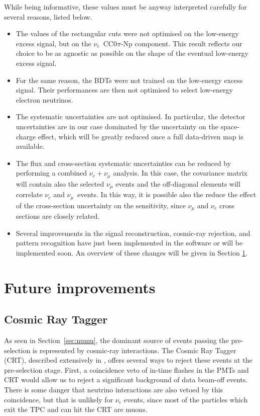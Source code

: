 While being informative, these values must be anyway interpreted carefully for several reasons, listed below.
\begin{itemize}
    \item The values of the rectangular cuts were not optimised on the low-energy excess signal, but on the $\nu_e$~CC0$\pi$-Np component. This result reflects our choice to be as agnostic as possible on the shape of the eventual low-energy excess signal.
    \item For the same reason, the BDTs were not trained on the low-energy excess signal. Their performances are then not optimised to select low-energy electron neutrinos.
    \item The systematic uncertainties are not optimised. In particular, the detector uncertainties are in our case dominated by the uncertainty on the space-charge effect, which will be greatly reduced once a full data-driven map is available.
    \item The flux and cross-section systematic uncertainties can be reduced by performing a combined $\nu_e+\nu_{\mu}$ analysis. In this case, the covariance matrix will contain also the selected $\nu_{\mu}$ events and the off-diagonal elements will correlate $\nu_e$ and $\nu_{\mu}$~events. In this way, it is possible also the reduce the effect of the cross-section uncertainty on the sensitivity, since $\nu_{\mu}$ and $\nu_e$ cross sections are closely related.
    \item Several improvements in the signal reconstruction, cosmic-ray rejection, and pattern recognition have just been implemented in the software or will be implemented soon. An overview of these changes will be given in Section \ref{sec:improvements}.
\end{itemize}

\section{Future improvements}\label{sec:improvements}
\subsection*{Cosmic Ray Tagger}
As seen in Section~\ref{sec:numu}, the dominant source of events passing the pre-selection is represented by cosmic-ray interactions.  The Cosmic Ray Tagger (CRT), described extensively in \cite{Auger:2016tjc}, offers several ways to reject these events at the pre-selection stage. First, a coincidence veto of in-time flashes in the PMTs and CRT would allow us to reject a significant background of data beam-off events.  There is some danger that neutrino interactions are also vetoed by this coincidence, but that is unlikely for $\nu_{e}$ events, since most of the particles which exit the TPC and can hit the CRT are muons.

